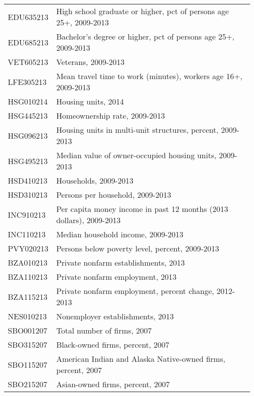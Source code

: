 {\begin{tabularx}{\textwidth}[H]{>{\hsize=0.16\hsize \ttfamily}X>{\hsize=0.84\hsize}X}
	EDU635213 & High school graduate or higher, pct of persons age 25+, 2009-2013  \\
	EDU685213 & Bachelor's degree or higher, pct of persons age 25+, 2009-2013     \\
	VET605213 & Veterans, 2009-2013                                                    \\
	LFE305213 & Mean travel time to work (minutes), workers age 16+, 2009-2013         \\
	HSG010214 & Housing units, 2014                                                    \\
	HSG445213 & Homeownership rate, 2009-2013                                          \\
	HSG096213 & Housing units in multi-unit structures, percent, 2009-2013             \\
	HSG495213 & Median value of owner-occupied housing units, 2009-2013                \\
	HSD410213 & Households, 2009-2013                                                  \\
	HSD310213 & Persons per household, 2009-2013                                       \\
	INC910213 & Per capita money income in past 12 months (2013 dollars), 2009-2013    \\
	INC110213 & Median household income, 2009-2013                                     \\
	PVY020213 & Persons below poverty level, percent, 2009-2013                        \\
	BZA010213 & Private nonfarm establishments, 2013                                   \\
	BZA110213 & Private nonfarm employment,  2013                                      \\
	BZA115213 & Private nonfarm employment, percent change, 2012-2013                  \\
	NES010213 & Nonemployer establishments, 2013                                       \\
	SBO001207 & Total number of firms, 2007                                            \\
	SBO315207 & Black-owned firms, percent, 2007                                       \\
	SBO115207 & American Indian and Alaska Native-owned firms, percent, 2007          \\
	SBO215207 & Asian-owned firms, percent, 2007                                       \\

\end{tabularx}}
